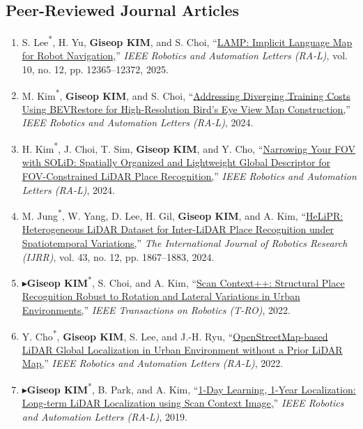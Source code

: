 \documentclass[10pt,a4paper]{article}
\newcommand{\pub}[2]{\Needspace{4\baselineskip}\item[#1.] #2}
\newcommand{\leadpub}{\textbf{\ensuremath{\blacktriangleright}}\hspace{0.25em}}
\newcommand{\me}{\textbf{Giseop KIM}}
\newcommand{\corr}{\textsuperscript{\dag}}
\newcommand{\first}{\textsuperscript{*}}
\begin{document}
\subsection{Peer-Reviewed Journal Articles}
\begin{enumerate}
\pub{J7}{S. Lee\first, H. Yu, \me, and S. Choi\corr, ``\href{https://arxiv.org/abs/2602.11862}{LAMP: Implicit Language Map for Robot Navigation,}'' \textit{IEEE Robotics and Automation Letters (RA-L)}, vol. 10, no. 12, pp. 12365--12372, 2025.}
\pub{J6}{M. Kim\first, \me, and S. Choi\corr, ``\href{https://arxiv.org/abs/2405.01016}{Addressing Diverging Training Costs Using BEVRestore for High-Resolution Bird's Eye View Map Construction,}'' \textit{IEEE Robotics and Automation Letters (RA-L)}, 2024.}
\pub{J5}{H. Kim\first, J. Choi, T. Sim, \me, and Y. Cho\corr, ``\href{https://arxiv.org/abs/2408.07330}{Narrowing Your FOV with SOLiD: Spatially Organized and Lightweight Global Descriptor for FOV-Constrained LiDAR Place Recognition,}'' \textit{IEEE Robotics and Automation Letters (RA-L)}, 2024.}
\pub{J4}{M. Jung\first, W. Yang, D. Lee, H. Gil, \me, and A. Kim\corr, ``\href{https://arxiv.org/abs/2309.14590}{HeLiPR: Heterogeneous LiDAR Dataset for Inter-LiDAR Place Recognition under Spatiotemporal Variations,}'' \textit{The International Journal of Robotics Research (IJRR)}, vol. 43, no. 12, pp. 1867--1883, 2024.}
\pub{J3}{\leadpub \me\first, S. Choi, and A. Kim\corr, ``\href{https://gisbi-kim.github.io/uploads/gkim-2021-tro.pdf}{Scan Context++: Structural Place Recognition Robust to Rotation and Lateral Variations in Urban Environments,}'' \textit{IEEE Transactions on Robotics (T-RO)}, 2022.}
\pub{J2}{Y. Cho\first, \me, S. Lee, and J.-H. Ryu\corr, ``\href{https://gisbi-kim.github.io/uploads/ycho-2022-ral.pdf}{OpenStreetMap-based LiDAR Global Localization in Urban Environment without a Prior LiDAR Map,}'' \textit{IEEE Robotics and Automation Letters (RA-L)}, 2022.}
\pub{J1}{\leadpub \me\first, B. Park, and A. Kim\corr, ``\href{https://gisbi-kim.github.io/uploads/gkim-2019-ral.pdf}{1-Day Learning, 1-Year Localization: Long-term LiDAR Localization using Scan Context Image,}'' \textit{IEEE Robotics and Automation Letters (RA-L)}, 2019.}
\end{enumerate}
\end{document}
